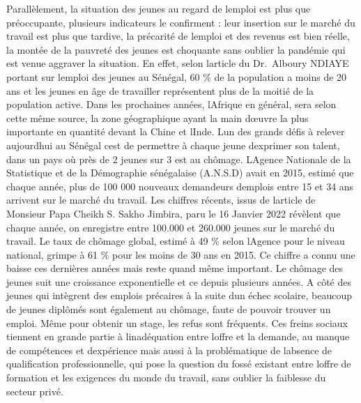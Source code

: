 \documentclass[
  letterpaper,
  DIV=11,
  numbers=noendperiod]{scrartcl}
\begin{document}
Parallèlement, la situation des jeunes au regard de
l\textquotesingle emploi est plus que préoccupante, plusieurs
indicateurs le confirment : leur insertion sur le marché du travail est
plus que tardive, la précarité de l\textquotesingle emploi et des
revenus est bien réelle, la montée de la pauvreté des jeunes est
choquante sans oublier la pandémie qui est venue aggraver la situation.
En effet, selon l\textquotesingle article du Dr.~Alboury NDIAYE portant
sur l\textquotesingle emploi des jeunes au Sénégal, 60 \% de la
population a moins de 20 ans et les jeunes en âge de travailler
représentent plus de la moitié de la population active. Dans les
prochaines années, l\textquotesingle Afrique en général, sera selon
cette même source, la zone géographique ayant la main
d\textquotesingle œuvre la plus importante en quantité devant la Chine
et l\textquotesingle Inde. L\textquotesingle un des grands défis à
relever aujourd\textquotesingle hui au Sénégal c\textquotesingle est de
permettre à chaque jeune d\textquotesingle exprimer son talent, dans un
pays où près de 2 jeunes sur 3 est au chômage. L\textquotesingle Agence
Nationale de la Statistique et de la Démographie sénégalaise (A.N.S.D)
avait en 2015, estimé que chaque année, plus de 100 000 nouveaux
demandeurs d\textquotesingle emplois entre 15 et 34 ans arrivent sur le
marché du travail. Les chiffres récents, issus de
l\textquotesingle article de Monsieur Papa Cheikh S. Sakho Jimbira, paru
le 16 Janvier 2022 révèlent que chaque année, on enregistre entre
100.000 et 260.000 jeunes sur le marché du travail. Le taux de chômage
global, estimé à 49 \% selon l\textquotesingle Agence pour le niveau
national, grimpe à 61 \% pour les moins de 30 ans en 2015. Ce chiffre a
connu une baisse ces dernières années mais reste quand même important.
Le chômage des jeunes suit une croissance exponentielle et ce depuis
plusieurs années. A côté des jeunes qui intègrent des emplois précaires
à la suite d\textquotesingle un échec scolaire, beaucoup de jeunes
diplômés sont également au chômage, faute de pouvoir trouver un emploi.
Même pour obtenir un stage, les refus sont fréquents. Ces freins sociaux
tiennent en grande partie à l\textquotesingle inadéquation entre
l\textquotesingle offre et la demande, au manque de compétences et
d\textquotesingle expérience mais aussi à la problématique de
l\textquotesingle absence de qualification professionnelle, qui pose la
question du fossé existant entre l\textquotesingle offre de formation et
les exigences du monde du travail, sans oublier la faiblesse du secteur
privé.
\end{document}
